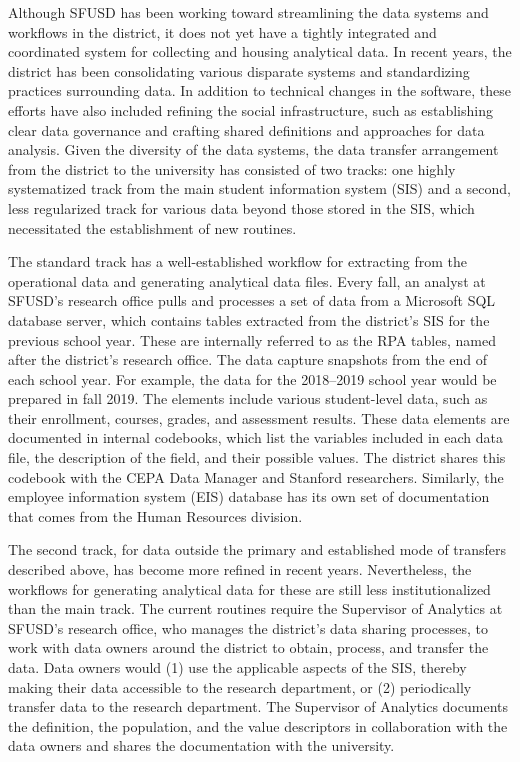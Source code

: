 Although SFUSD has been working toward streamlining the data systems and workflows in the district, it does not yet have a tightly integrated and coordinated system for collecting and housing analytical data. In recent years, the district has been consolidating various disparate systems and standardizing practices surrounding data. In addition to technical changes in the software, these efforts have also included refining the social infrastructure, such as establishing clear data governance and crafting shared definitions and approaches for data analysis. Given the diversity of the data systems, the data transfer arrangement from the district to the university has consisted of two tracks: one highly systematized track from the main student information system (SIS) and a second, less regularized track for various data beyond those stored in the SIS, which necessitated the establishment of new routines.

The standard track has a well-established workflow for extracting from the operational data and generating analytical data files. Every fall, an analyst at SFUSD's research office pulls and processes a set of data from a Microsoft SQL database server, which contains tables extracted from the district's SIS for the previous school year. These are internally referred to as the RPA tables, named after the district's research office. The data capture snapshots from the end of each school year. For example, the data for the 2018--2019 school year would be prepared in fall 2019. The elements include various student-level data, such as their enrollment, courses, grades, and assessment results. These data elements are documented in internal codebooks, which list the variables included in each data file, the description of the field, and their possible values. The district shares this codebook with the CEPA Data Manager and Stanford researchers. Similarly, the employee information system (EIS) database has its own set of documentation that comes from the Human Resources division.

The second track, for data outside the primary and established mode of transfers described above, has become more refined in recent years. Nevertheless, the workflows for generating analytical data for these are still less institutionalized than the main track. The current routines require the Supervisor of Analytics at SFUSD's research office, who manages the district's data sharing processes, to work with data owners around the district to obtain, process, and transfer the data. Data owners would (1) use the applicable aspects of the SIS, thereby making their data accessible to the research department, or (2) periodically transfer data to the research department. The Supervisor of Analytics documents the definition, the population, and the value descriptors in collaboration with the data owners and shares the documentation with the university.

